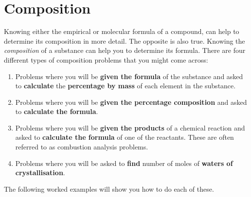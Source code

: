          \section{Composition}
    \nopagebreak
      \label{m38712*id280450}Knowing either the empirical or molecular formula of a compound, can help to determine its composition in more detail. The opposite is also true. Knowing the \textsl{composition} of a substance can help you to determine its formula. There are four different types of composition problems that you might come across:\par 
      \label{m38712*id280463}\begin{enumerate}[noitemsep, label=\textbf{\arabic*}. ] 
\item Problems where you will be \textbf{given the formula} of the substance and asked to \textbf{calculate} the \textbf{percentage by mass} of each element in the substance.
\item Problems where you will be \textbf{given the percentage composition} and asked to \textbf{calculate the formula}.
\item Problems where you will be \textbf{given the products} of a chemical reaction and asked to \textbf{calculate the formula} of one of the reactants. These are often referred to as combustion analysis problems.
\item Problems where you will be asked to \textbf{find} number of moles of \textbf{waters of crystallisation}.
\end{enumerate}
The following worked examples will show you how to do each of these.
\par
            \label{m38712*secfhsst!!!underscore!!!id901}
      \noindent
{}

